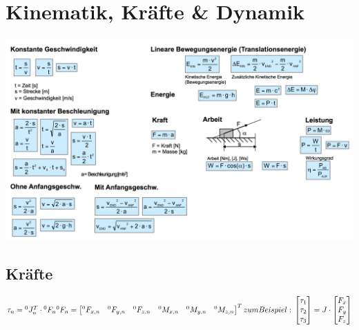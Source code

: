 \section{Kinematik, Kräfte \& Dynamik}
\includegraphics[width=17cm]{./bilder/kinematik.png} \\

\subsection{Kräfte}
$\tau_{n}={}^0J^T_n \cdot {}^0F_n  \\ \\
{}^0F_n = \begin{bmatrix} {}^0F_{x,n} & {}^0F_{y,n} & {}^0F_{z,n} & {}^0M_{x,n}
& {}^0M_{y,n} & {}^0M_{z,n}
\end{bmatrix}^{T}  \\ \\
zum Beispiel: \\
\begin{bmatrix}
\tau_{1} \\ \tau_{2} \\ \tau_{3}
\end{bmatrix}          
=  J \cdot
\begin{bmatrix}
F_{x} \\ F_{y} \\ F_{z}
\end{bmatrix}
$